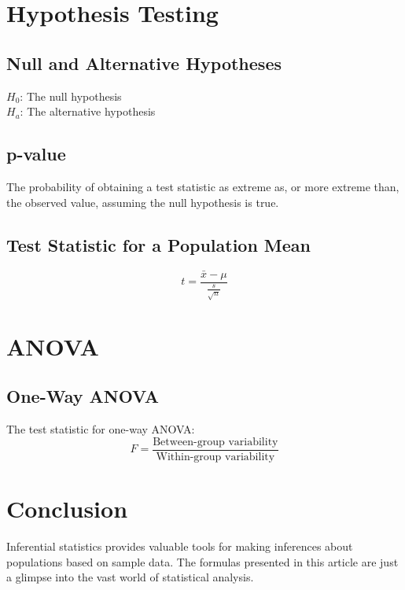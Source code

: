 \documentclass{article}
\begin{document}
\section{Hypothesis Testing}

\subsection{Null and Alternative Hypotheses}
$H_0$: The null hypothesis \\
$H_a$: The alternative hypothesis

\subsection{p-value}
The probability of obtaining a test statistic as extreme as, or more extreme than, the observed value, assuming the null hypothesis is true.

\subsection{Test Statistic for a Population Mean}
\[
t = \frac{\bar{x} - \mu}{\frac{s}{\sqrt{n}}}
\]

\section{ANOVA}

\subsection{One-Way ANOVA}
The test statistic for one-way ANOVA:
\[
F = \frac{\text{Between-group variability}}{\text{Within-group variability}}
\]

\section{Conclusion}
Inferential statistics provides valuable tools for making inferences about populations based on sample data. The formulas presented in this article are just a glimpse into the vast world of statistical analysis.
\end{document}

